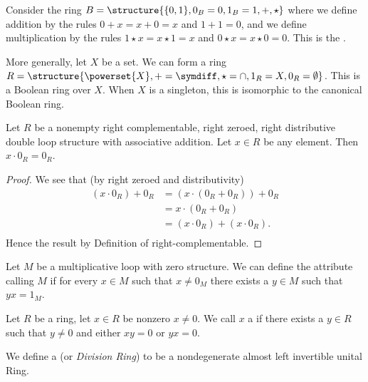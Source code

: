 \begin{example}
Consider the ring $B = \structure{\{0,1\}, 0_{B} = 0, 1_{B} = 1, +, \star}$
where we define addition by the rules $0+x=x+0=x$ and $1+1=0$, and we
define multiplication by the rules $1\star x=x\star 1=x$ and $0\star x=x\star0=0$.
This is the .

More generally, let $X$ be a set. We can form a ring $R=\structure{\powerset{X},+=\symdiff,\star=\cap,1_{R}=X,0_{R}=\emptyset}$.
This is a Boolean ring over $X$. When $X$ is a singleton, this is
isomorphic to the canonical Boolean ring.
\end{example}

\begin{theorem}
Let $R$ be a nonempty right complementable, right zeroed, right
distributive double loop structure with associative addition.
Let $x\in R$ be any element.
Then $x\cdot 0_{R}=0_{R}$.
\end{theorem}

\begin{proof}
We see that (by right zeroed and distributivity)
\begin{equation*}
\begin{aligned}
(x\cdot 0_{R}) + 0_{R} &= (x\cdot(0_{R} + 0_{R})) + 0_{R}\\
&= x\cdot(0_{R} + 0_{R})\\
&= (x\cdot0_{R}) + (x\cdot0_{R}).\\
\end{aligned}
\end{equation*}
Hence the result by Definition of right-complementable.
\end{proof}

\begin{definition}
Let $M$ be a multiplicative loop with zero structure.
We can define the attribute calling $M$  
if for every $x\in M$ such that $x\neq 0_{M}$ there exists a $y\in M$
such that $yx=1_{M}$.
\end{definition}

\begin{definition}
Let $R$ be a ring, let $x\in R$ be nonzero $x\neq 0$.
We call $x$ a  if there exists a $y\in R$ such
that $y\neq0$ and either $xy=0$ or $yx=0$.
\end{definition}

\begin{definition}
We define a  (or \emph{Division Ring}) to be a
nondegenerate almost left invertible unital Ring.
\end{definition}

